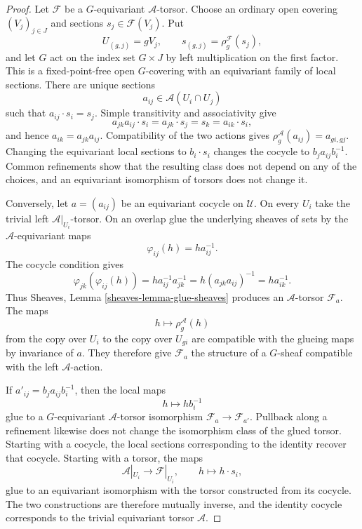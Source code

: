\begin{proof}
Let $\mathcal F$ be a $G$-equivariant $\mathcal A$-torsor. Choose an
ordinary open covering $(V_j)_{j\in J}$ and sections
$s_j\in\mathcal F(V_j)$. Put
$$
U_{(g,j)}=gV_j,
\qquad
s_{(g,j)}=\rho_g^{\mathcal F}(s_j),
$$
and let $G$ act on the index set $G\times J$ by left multiplication on
the first factor. This is a fixed-point-free open $G$-covering with an
equivariant family of local sections. There are unique sections
$$
a_{ij}\in\mathcal A(U_i\cap U_j)
$$
such that $a_{ij}\cdot s_i=s_j$. Simple transitivity and associativity
give
$$
a_{jk}a_{ij}\cdot s_i=a_{jk}\cdot s_j=s_k=a_{ik}\cdot s_i,
$$
and hence $a_{ik}=a_{jk}a_{ij}$. Compatibility of the two actions gives
$\rho_g^{\mathcal A}(a_{ij})=a_{gi,gj}$. Changing the equivariant local
sections to $b_i\cdot s_i$ changes the cocycle to
$b_ja_{ij}b_i^{-1}$. Common refinements show that the resulting class
does not depend on any of the choices, and an equivariant isomorphism of
torsors does not change it.

Conversely, let $a=(a_{ij})$ be an equivariant cocycle on $\mathcal U$.
On every $U_i$ take the trivial left $\mathcal A|_{U_i}$-torsor. On an
overlap glue the underlying sheaves of sets by the
$\mathcal A$-equivariant maps
$$
\varphi_{ij}(h)=h a_{ij}^{-1}.
$$
The cocycle condition gives
$$
\varphi_{jk}(\varphi_{ij}(h))
=h a_{ij}^{-1}a_{jk}^{-1}
=h(a_{jk}a_{ij})^{-1}
=h a_{ik}^{-1}.
$$
Thus Sheaves, Lemma \ref{sheaves-lemma-glue-sheaves} produces an
$\mathcal A$-torsor $\mathcal F_a$. The maps
$$
h\longmapsto\rho_g^{\mathcal A}(h)
$$
from the copy over $U_i$ to the copy over $U_{gi}$ are compatible with
the glueing maps by invariance of $a$. They therefore give
$\mathcal F_a$ the structure of a $G$-sheaf compatible with the left
$\mathcal A$-action.

If $a'_{ij}=b_ja_{ij}b_i^{-1}$, then the local maps
$$
h\longmapsto h b_i^{-1}
$$
glue to a $G$-equivariant $\mathcal A$-torsor isomorphism
$\mathcal F_a\to\mathcal F_{a'}$. Pullback along a refinement likewise
does not change the isomorphism class of the glued torsor. Starting with
a cocycle, the local sections corresponding to the identity recover
that cocycle. Starting with a torsor, the maps
$$
\mathcal A|_{U_i}\longrightarrow\mathcal F|_{U_i},
\qquad h\longmapsto h\cdot s_i,
$$
glue to an equivariant isomorphism with the torsor constructed from its
cocycle. The two constructions are therefore mutually inverse, and the
identity cocycle corresponds to the trivial equivariant torsor
$\mathcal A$.


\end{proof}
